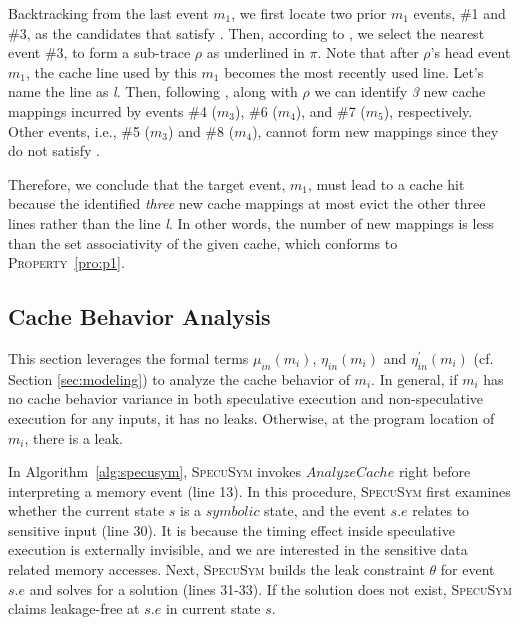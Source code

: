 \documentclass[sigconf,screen]{acmart}
\newcommand*\circled[1]{\tikz[baseline=(char.base)]{
				\node[shape=circle,draw,inner sep=1pt] (char) {\scriptsize{#1}};}}
\newcommand{\SpecuSym}{\textsc{SpecuSym} }
\begin{document}
Backtracking from the last event $\mathit{m_1}$, we first locate two prior 
$\mathit{m_1}$ events, \#1 and \#3, as the candidates that satisfy \circled{4}. 
Then, according to \circled{5}, we select the nearest event \#3, to form a 
sub-trace $\rho$ as underlined in $\pi$. Note that after $\rho$'s head event 
$\mathit{m_1}$, the cache line used by this $\mathit{m_1}$ becomes the most 
recently used line. Let's name the line as \emph{l}. Then, following \circled{6}, 
along with $\rho$ we can identify \emph{3} new cache mappings incurred by events 
\#4 ($\mathit{m_3}$), \#6 ($\mathit{m_4}$), and \#7 ($\mathit{m_5}$), 
respectively. Other events, i.e., \#5 ($\mathit{m_3}$) and \#8 ($\mathit{m_4}$),
cannot form new mappings since they do not satisfy \circled{6}.


Therefore, we conclude that the target event, $\mathit{m_1}$, must lead to 
a cache hit because the identified \textit{three} new cache mappings at most 
evict the other three lines rather than the line \emph{l}. In other words, 
the number of new mappings is less than the set associativity of the given 
cache, which conforms to \textsc{Property}~\ref{pro:p1}.


\subsection{Cache Behavior Analysis}
\label{sec:analysis}

This section leverages the formal terms $\mathit{\mu_{in}(m_i)}$, 
$\mathit{\eta_{in}(m_i)}$ and $\mathit{\eta^\prime_{in}(m_i)}$ (cf. Section
\ref{sec:modeling}) to analyze the cache behavior of $\mathit{m_i}$. In general, 
if $\mathit{m_i}$ has no cache behavior variance in both speculative execution 
and non-speculative execution for any inputs, it has no leaks. Otherwise, at the 
program location of $\mathit{m_i}$, there is a leak. 



In Algorithm~\ref{alg:specusym}, \SpecuSym invokes $\mathit{AnalyzeCache}$ right
before interpreting a memory event (line 13). In this procedure, \SpecuSym first 
examines whether the current state $s$ is a $\mathit{symbolic}$ state, and the 
event $s.e$ relates to sensitive input (line 30). It is because the timing effect 
inside speculative execution is externally invisible, and we are interested in the 
sensitive data related memory accesses. Next, \SpecuSym builds the leak constraint 
$\theta$ for event $s.e$ and solves for a solution (lines 31-33). If the solution
does not exist, \SpecuSym claims leakage-free at $s.e$ in current state $s$.
\end{document}
